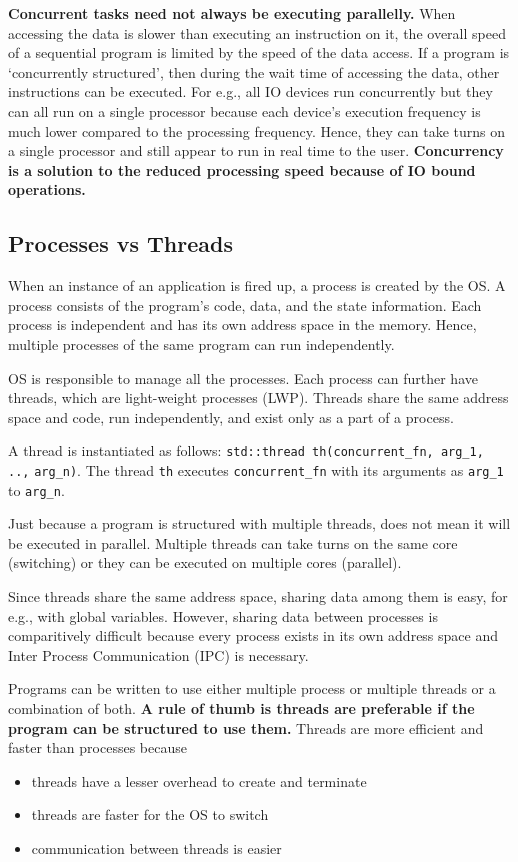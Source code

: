\documentclass{scrartcl}
\begin{document}
\textbf{Concurrent tasks need not always be executing parallelly.} When accessing the data is slower than executing an instruction on it, the overall speed of a sequential program is limited by the speed of the data access. If a program is `concurrently structured', then during the wait time of accessing the data, other instructions can be executed. For e.g., all IO devices run concurrently but they can all run on a single processor because each device's execution frequency is much lower compared to the processing frequency. Hence, they can take turns on a single processor and still appear to run in real time to the user. \textbf{Concurrency is a solution to the reduced processing speed because of IO bound operations.}

\subsection{Processes vs Threads}
When an instance of an application is fired up, a process is created by the OS. A process consists of the program's code, data, and the state information. Each process is independent and has its own address space in the memory. Hence, multiple processes of the same program can run independently.

OS is responsible to manage all the processes. Each process can further have threads, which are light-weight processes (LWP). Threads share the same address space and code, run independently, and exist only as a part of a process. 

A thread is instantiated as follows: \texttt{std::thread th(concurrent_fn, arg_1, ..,}   \texttt{arg_n)}. The thread \texttt{th} executes \texttt{concurrent_fn} with its arguments as \texttt{arg_1} to \texttt{arg_n}. 

Just because a program is structured with multiple threads, does not mean it will be executed in parallel. Multiple threads can take turns on the same core (switching) or they can be executed on multiple cores (parallel). 

Since threads share the same address space, sharing data among them is easy, for e.g., with global variables. However, sharing data between processes is comparitively difficult because every process exists in its own address space and Inter Process Communication (IPC) is necessary. %

Programs can be written to use either multiple process or multiple threads or a combination of both. \textbf{A rule of thumb is threads are preferable if the program can be structured to use them.} Threads are more efficient and faster than processes because
\begin{itemize}
	\item threads have a lesser overhead to create and terminate
	\item threads are faster for the OS to switch
	\item communication between threads is easier
\end{itemize}
\end{document}
